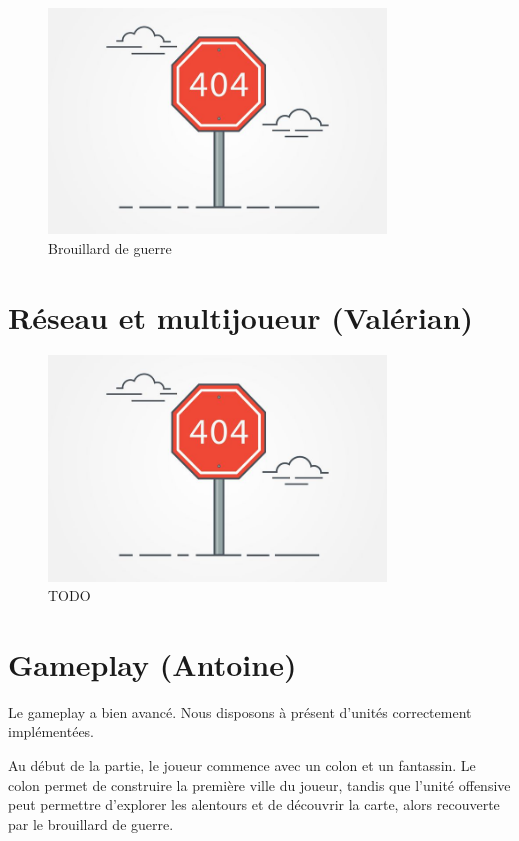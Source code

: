 \documentclass[12pt]{report}
\begin{document}
\begin{figure}[H]
    \centering
    \includegraphics[width=0.8\textwidth]{404}
    \caption{Brouillard de guerre}
\end{figure}

\section{Réseau et multijoueur (Valérian)}

\begin{figure}[H]
    \centering
    \includegraphics[width=0.8\textwidth]{404}
    \caption{TODO}
\end{figure}

\section{Gameplay (Antoine)}

Le gameplay a bien avancé. Nous disposons à présent d’unités correctement implémentées.

Au début de la partie, le joueur commence avec un colon et un fantassin. Le colon permet de construire la première ville du joueur, tandis que l’unité offensive peut permettre d’explorer les alentours et de découvrir la carte, alors recouverte par le brouillard de guerre. 
\end{document}
